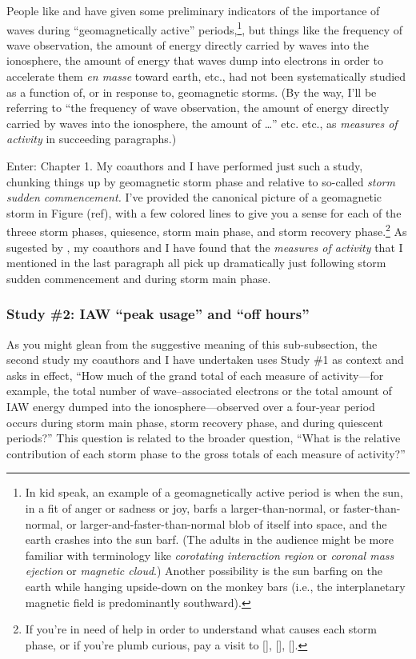 People like \citet{Chaston2007} and \citet{Newell2009} have given some
preliminary indicators of the importance of \Alf waves during ``geomagnetically
active'' periods,\footnote{In kid speak, an example of a geomagnetically active
  period is when the sun, in a fit of anger or sadness or joy, barfs a
  larger-than-normal, or faster-than-normal, or larger-and-faster-than-normal
  blob of itself into space, and the earth crashes into the sun barf. (The
  adults in the audience might be more familiar with terminology like
  \emph{corotating interaction region} or \emph{coronal mass ejection} or
  \emph{magnetic cloud}.) Another possibility is the sun barfing on the earth
  while hanging upside-down on the monkey bars (i.e., the interplanetary
  magnetic field is predominantly southward).}, but things like the frequency of
\Alf wave observation, the amount of energy directly carried by \Alf waves into
the ionosphere, the amount of energy that \Alf waves dump into electrons in
order to accelerate them \textit{en masse} toward earth, etc., had not been
systematically studied as a function of, or in response to, geomagnetic
storms. (By the way, I'll be referring to ``the frequency of \Alf wave
observation, the amount of energy directly carried by \Alf waves into the
ionosphere, the amount of \dots'' etc. etc., as \emph{measures of \Alfic
  activity} in succeeding paragraphs.)

Enter: Chapter 1. My coauthors and I have performed just such a study, chunking
things up by geomagnetic storm phase and relative to so-called \emph{storm
  sudden commencement.} I've provided the canonical picture of a geomagnetic
storm in Figure (ref), with a few colored lines to give you a sense for each of
the threee storm phases, quiesence, storm main phase, and storm recovery
phase.\footnote{If you're in need of help in order to understand what causes
  each storm phase, or if you're plumb curious, pay a visit to [], [], [].} As
sugested by \citet{Chaston2007}, my coauthors and I have found that the
\emph{measures of \Alfic activity} that I mentioned in the last paragraph all
pick up dramatically just following storm sudden commencement and during storm
main phase.

\subsubsection{Study \#2: IAW ``peak usage'' and ``off hours''}

As you might glean from the suggestive meaning of this sub-subsection, the
second study my coauthors and I have undertaken uses Study \#1 as context and
asks in effect, ``How much of the grand total of each measure of \Alfic
activity---for example, the total number of \Alf wave--associated electrons or
the total amount of IAW energy dumped into the ionosphere---observed over a
four-year period occurs during storm main phase, storm recovery phase, and
during quiescent periods?'' This question is related to the broader question,
``What is the relative contribution of each storm phase to the gross totals of
each measure of \Alfic activity?''

